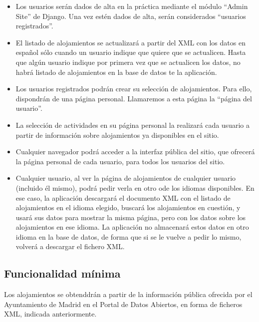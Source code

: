 \begin{itemize}
\item Los usuarios serán dados de alta en la práctica mediante el módulo ``Admin Site'' de Django. Una vez estén dados de alta, serán considerados ``usuarios registrados''.

\item El listado de alojamientos se actualizará a partir del XML con los datos en español sólo cuando un usuario indique que quiere que se actualicen. Hasta que algún usuario indique por primera vez que se actualicen los datos, no habrá listado de alojamientos en la base de datos te la aplicación.

\item Los usuarios registrados podrán crear su selección de alojamientos. Para ello, dispondrán de una página personal. Llamaremos a esta página la ``página del usuario''.

\item La selección de actividades en su página personal la realizará cada usuario a partir de información sobre alojamientos ya disponibles en el sitio.

\item Cualquier navegador podrá acceder a la interfaz pública del sitio, que ofrecerá la página personal de cada usuario, para todos los usuarios del sitio.

\item Cualquier usuario, al ver la página de alojamientos de cualquier usuario (incluido él mismo), podrá pedir verla en otro ode los idiomas disponibles. En ese caso, la aplicación descargará el documento XML con el listado de alojamientos en el idioma elegido, buscará los alojamientos en cuestión, y usará sus datos para mostrar la misma página, pero con los datos sobre los alojamientos en ese idioma. La aplicación no almacenará estos datos en otro idioma en la base de datos, de forma que si se le vuelve a pedir lo mismo, volverá a descargar el fichero XML. 
\end{itemize}


\subsection{Funcionalidad mínima}

Los alojamientos se obtenddrán a partir de la información pública ofrecida por el Ayuntamiento de Madrid en el Portal de Datos Abiertos, en forma de ficheros XML, indicada anteriormente.

